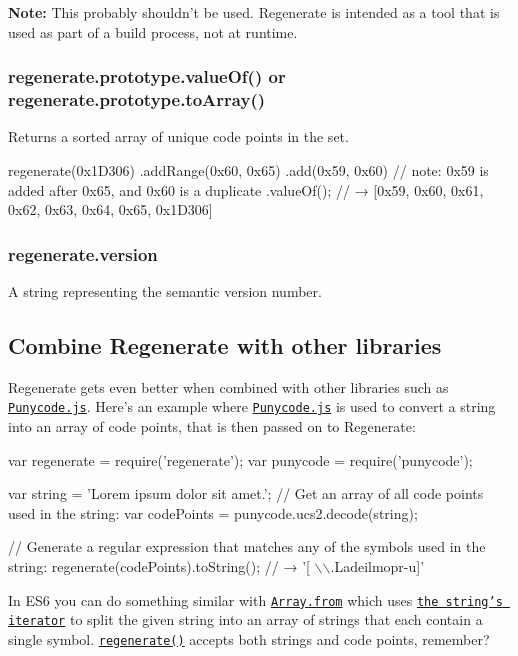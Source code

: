 {\bfseries Note\+:} This probably shouldn’t be used. Regenerate is intended as a tool that is used as part of a build process, not at runtime.

\subsubsection*{{\ttfamily regenerate.\+prototype.\+value\+Of()} or {\ttfamily regenerate.\+prototype.\+to\+Array()}}

Returns a sorted array of unique code points in the set.


\begin{DoxyCode}
regenerate(0x1D306)
  .addRange(0x60, 0x65)
  .add(0x59, 0x60) // note: 0x59 is added after 0x65, and 0x60 is a duplicate
  .valueOf();
// → [0x59, 0x60, 0x61, 0x62, 0x63, 0x64, 0x65, 0x1D306]
\end{DoxyCode}


\subsubsection*{{\ttfamily regenerate.\+version}}

A string representing the semantic version number.

\subsection*{Combine Regenerate with other libraries}

Regenerate gets even better when combined with other libraries such as \href{https://mths.be/punycode}{\tt Punycode.\+js}. Here’s an example where \href{https://mths.be/punycode}{\tt Punycode.\+js} is used to convert a string into an array of code points, that is then passed on to Regenerate\+:


\begin{DoxyCode}
var regenerate = require('regenerate');
var punycode = require('punycode');

var string = 'Lorem ipsum dolor sit amet.';
// Get an array of all code points used in the string:
var codePoints = punycode.ucs2.decode(string);

// Generate a regular expression that matches any of the symbols used in the string:
regenerate(codePoints).toString();
// → '[ \(\backslash\)\(\backslash\).Ladeilmopr-u]'
\end{DoxyCode}


In E\+S6 you can do something similar with \href{https://mths.be/array-from}{\tt {\ttfamily Array.\+from}} which uses \href{https://mathiasbynens.be/notes/javascript-unicode#iterating-over-symbols}{\tt the string’s iterator} to split the given string into an array of strings that each contain a single symbol. \href{#regenerateprototypeaddvalue1-value2-value3-}{\tt {\ttfamily regenerate()}} accepts both strings and code points, remember?


